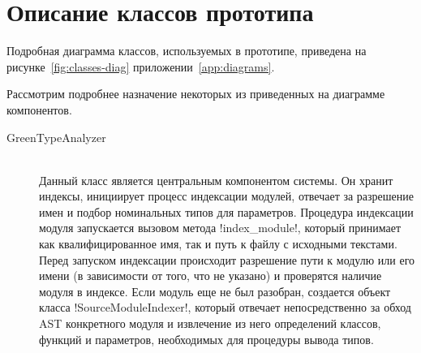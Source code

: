 \section{Описание классов прототипа}
\label{sec:classes-description}

Подробная диаграмма классов, используемых в прототипе, приведена на
 рисунке~\ref{fig:classes-diag} приложении~\ref{app:diagrams}.

Рассмотрим подробнее назначение некоторых из приведенных на диаграмме компонентов.

\begin{description}
  \item[GreenTypeAnalyzer] \hfill \\
    Данный класс является центральным компонентом системы. Он хранит индексы,
    инициирует процесс индексации модулей, отвечает за разрешение имен и подбор
    номинальных типов для параметров. Процедура индексации модуля запускается
    вызовом метода !index_module!, который принимает как квалифицированное имя,
    так и путь к файлу с исходными текстами. Перед запуском индексации
    происходит разрешение пути к модулю или его имени (в зависимости от того, что
    не указано) и проверятся наличие модуля в индексе. Если модуль еще не был
    разобран, создается объект класса !SourceModuleIndexer!, который отвечает
    непосредственно за обход AST конкретного модуля и извлечение из него
    определений классов, функций и параметров, необходимых для процедуры вывода
    типов.


\end{description}
